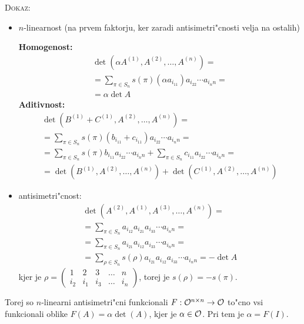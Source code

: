 \textsc{Dokaz:}
\begin{itemize}
	\item $n$-linearnost (na prvem faktorju, ker zaradi antisimetri"cnosti velja na ostalih)
	
	\textbf{Homogenost:}
	\begin{multline*}
		\det(\alpha A^{(1)}, A^{(2)}, \ldots, A^{(n)}) = \\
		= \sum_{\pi \in S_n} s(\pi) (\alpha a_{i_11}) a_{i_22} \cdots a_{i_nn} = \\
		= \alpha \det A
	\end{multline*}
	\textbf{Aditivnost:}
	\begin{multline*}
		\det (B^{(1)} + C^{(1)}, A^{(2)}, \ldots, A^{(n)}) = \\
		= \sum_{\pi \in S_n} s(\pi) (b_{i_11} + c_{i_11}) a_{i_22} \cdots a_{i_nn} = \\
		= \sum_{\pi \in S_n} s(\pi) b_{i_11} a_{i_22} \cdots a_{i_nn} + \sum_{\pi \in S_n} c_{i_11} a_{i_22} \cdots a_{i_nn} = \\
		= \det(B^{(1)}, A^{(2)}, \ldots, A^{(n)}) + \det (C^{(1)}, A^{(2)}, \ldots, A^{(n)})
	\end{multline*}
	
	\item antisimetri"cnost:
	\begin{multline*}
		\det(A^{(2)}, A^{(1)}, A^{(3)}, \ldots, A^{(n)}) = \\
		= \sum_{\pi \in S_n} a_{i_12} a_{i_21} a_{i_33} \cdots a_{i_nn} = \\
		= \sum_{\pi \in S_n} a_{i_21} a_{i_12} a_{i_33} \cdots a_{i_nn} = \\
		= \sum_{\rho \in S_n} s(\rho) a_{i_21} a_{i_12} a_{i_33} \cdots a_{i_nn} = -\det A
	\end{multline*}
	kjer je $\rho = \begin{pmatrix}
	1 & 2 & 3 & \ldots & n \\
	i_2 & i_1 & i_3 & \ldots & i_n
	\end{pmatrix}$, torej je $s(\rho) = - s(\pi)$.
\end{itemize}
Torej so $n$-linearni antisimetri"cni funkcionali $F: \mathcal{O}^{n \times n} \to \mathcal{O}$ to"cno vsi funkcionali oblike $F(A) = \alpha \det(A)$, kjer je $\alpha \in \mathcal{O}$. Pri tem je $\alpha = F(I)$.

